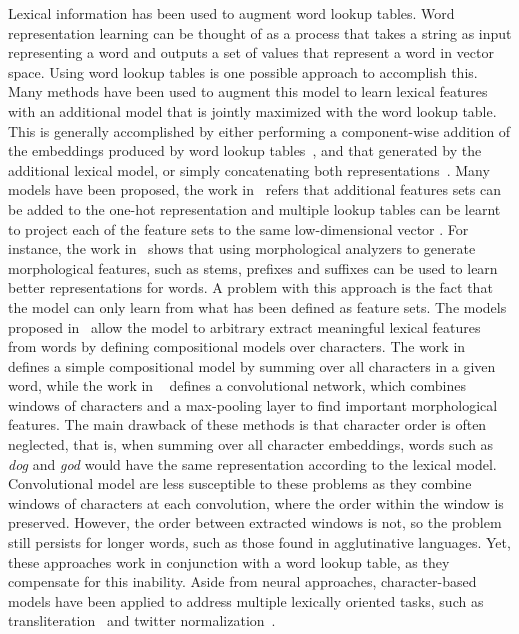 \documentclass[11pt]{article}
\newcommand{\examp}[1]{\emph{#1}}
\begin{document}
\begin{CJK*}{UTF8}{gbsn}
Lexical information has been used to augment word lookup tables. Word representation learning can be thought of as a process that takes a string as input representing a word and outputs a set of values that represent a word in vector space. Using word lookup tables is one possible approach to accomplish this. Many methods have been used to augment this model to learn lexical features with an additional model that is jointly maximized with the word lookup table. This is generally accomplished by either performing a component-wise addition of the embeddings produced by word lookup tables~\cite{chenjoint}, and that generated by the additional lexical model, or simply concatenating both representations~\cite{icml2014c2_santos14}. Many models have been proposed, the work in~\cite{collobert2011natural} refers that additional features sets  can be added to the one-hot representation and multiple lookup tables  can be learnt to project each of the feature sets to the same low-dimensional vector . For instance, the work in~\cite{Botha2014} shows that using morphological analyzers to generate morphological features, such as stems, prefixes and suffixes can be used to learn better representations for words. A problem with this approach is the fact that the model can only learn from what has been defined as feature sets. The models proposed in~\cite{icml2014c2_santos14,chenjoint} allow the model to arbitrary extract meaningful lexical features from words by defining compositional models over characters. The work in~\cite{chenjoint} defines a simple compositional model by summing over all characters in a given word, while the work in ~\cite{icml2014c2_santos14} defines a convolutional network, which combines windows of characters and a max-pooling layer to find important morphological features. The main drawback of these methods is that character order is often neglected, that is, when summing over all character embeddings, words such as \examp{dog} and \examp{god} would have the same representation according to the lexical model. Convolutional model are less susceptible to these problems as they combine windows of characters at each convolution, where the order within the window is preserved. However, the order between extracted windows is not, so the problem still persists for longer words, such as those found in agglutinative languages. Yet, these approaches work in conjunction with a word lookup table, as they compensate for this inability. Aside from neural approaches, character-based models have been applied to address multiple lexically oriented tasks, such as transliteration~\cite{kang2000automatic} and twitter normalization~\cite{xu-ritter-grishman:2013:BUCC,ling-EtAl:2013:EMNLP}.


\end{CJK*}
\end{document}
